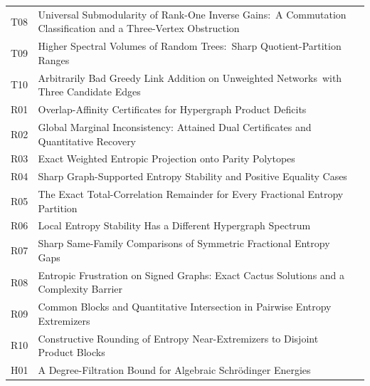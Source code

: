\documentclass[11pt,a4paper]{article}
\theoremstyle{definition}\newtheorem{definition}[theorem]{Definition}
\theoremstyle{remark}\newtheorem{remark}[theorem]{Remark}
\numberwithin{equation}{section}
\begin{document}
\begin{longtable}{@{}p{}p{}r@{}}
T08 & Universal Submodularity of Rank-One Inverse Gains:\ A Commutation Classification and a Three-Vertex Obstruction & \pageref{contrib-T08}\\

T09 & Higher Spectral Volumes of Random Trees:\ Sharp Quotient-Partition Ranges & \pageref{contrib-T09}\\

T10 & Arbitrarily Bad Greedy Link Addition on Unweighted Networks\ with Three Candidate Edges & \pageref{contrib-T10}\\

R01 & Overlap-Affinity Certificates for Hypergraph Product Deficits & \pageref{contrib-R01}\\

R02 & Global Marginal Inconsistency: Attained Dual Certificates and Quantitative Recovery & \pageref{contrib-R02}\\

R03 & Exact Weighted Entropic Projection onto Parity Polytopes & \pageref{contrib-R03}\\

R04 & Sharp Graph-Supported Entropy Stability and Positive Equality Cases & \pageref{contrib-R04}\\

R05 & The Exact Total-Correlation Remainder for Every Fractional Entropy Partition & \pageref{contrib-R05}\\

R06 & Local Entropy Stability Has a Different Hypergraph Spectrum & \pageref{contrib-R06}\\

R07 & Sharp Same-Family Comparisons of Symmetric Fractional Entropy Gaps & \pageref{contrib-R07}\\

R08 & Entropic Frustration on Signed Graphs: Exact Cactus Solutions and a Complexity Barrier & \pageref{contrib-R08}\\

R09 & Common Blocks and Quantitative Intersection in Pairwise Entropy Extremizers & \pageref{contrib-R09}\\

R10 & Constructive Rounding of Entropy Near-Extremizers to Disjoint Product Blocks & \pageref{contrib-R10}\\

H01 & A Degree-Filtration Bound for Algebraic Schr\"odinger Energies & \pageref{contrib-H01}\\


\end{longtable}
\end{document}
